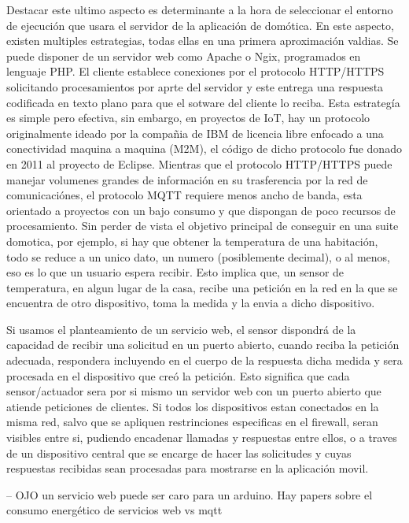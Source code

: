 Destacar este ultimo aspecto es determinante a la hora de seleccionar el entorno de ejecución que usara el servidor de la aplicación de domótica. En este aspecto, existen multiples estrategias, todas ellas en una primera aproximación valdias. Se puede disponer de un servidor web como Apache o Ngix, programados en lenguaje PHP. El cliente establece conexiones por el protocolo HTTP/HTTPS solicitando procesamientos por aprte del servidor y este entrega una respuesta codificada en texto plano para que el sotware del cliente lo reciba. Esta estrategía es simple pero efectiva, sin embargo, en proyectos de IoT, hay un protocolo originalmente ideado por la compañia de IBM de licencia libre enfocado a una conectividad maquina a maquina (M2M), el código de dicho protocolo fue donado en 2011 al proyecto de Eclipse. Mientras que el protocolo HTTP/HTTPS puede manejar volumenes grandes de información en su trasferencia por la red de comunicaciónes, el protocolo MQTT requiere menos ancho de banda, esta orientado a proyectos con un bajo consumo  y que dispongan de poco recursos de procesamiento. Sin perder de vista el objetivo principal de conseguir en una suite domotica, por ejemplo, si hay que obtener la temperatura de una habitación, todo se reduce a un unico dato, un numero (posiblemente decimal), o al menos, eso es lo que un usuario espera recibir. Esto implica que, un sensor de temperatura, en algun lugar de la casa, recibe una petición en la red en la que se encuentra de otro dispositivo, toma la medida y la envia a dicho dispositivo.

Si usamos el planteamiento de un servicio web, el sensor dispondrá de la capacidad de recibir una solicitud en un puerto abierto, cuando reciba la petición adecuada, respondera incluyendo en el cuerpo de la respuesta dicha medida y sera procesada en el dispositivo que creó la petición. Esto significa que cada sensor/actuador sera por si mismo un servidor web con un puerto abierto que atiende peticiones de clientes. Si todos los dispositivos estan conectados en la misma red, salvo que se apliquen restrinciones especificas en el firewall, seran visibles entre si, pudiendo encadenar llamadas y respuestas entre ellos, o a traves de un dispositivo central que se encarge de hacer las solicitudes y cuyas respuestas recibidas sean procesadas para mostrarse en la aplicación movil.

 -- OJO
 un servicio web puede ser caro para un arduino. Hay papers sobre el consumo energético de servicios web vs mqtt

